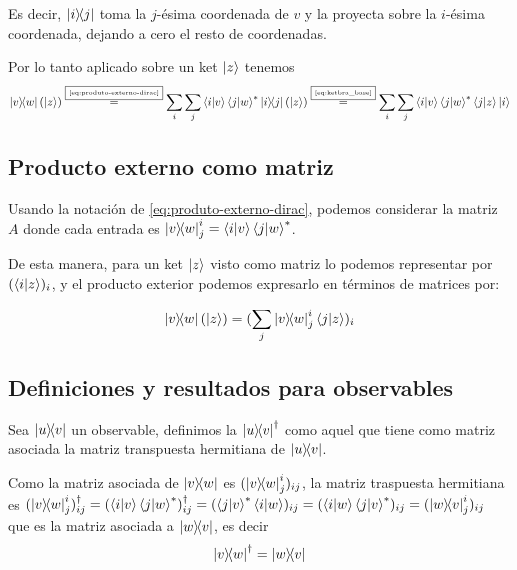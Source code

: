 Es decir, $\ketbra{i}{j}$ toma la $j$-ésima coordenada de $v$ y la proyecta sobre la $i$-ésima coordenada, dejando a cero el resto de coordenadas.

Por lo tanto aplicado sobre un ket $\ket{z}$ tenemos
\begin{equation}
	\label{eq:producto-externo-ket-coordenadas}
	\ketbra{v}{w}\left( \ket{z} \right) \overset{\fbox{\tiny \ref{eq:produto-externo-dirac}}}{=} \sum_{i}\sum_{j}\braket{i}{v}\braket{j}{w}^*\ketbra{i}{j}\left( \ket{z} \right)\overset{\fbox{\tiny \ref{eq:ketbra_base}}}{=}\sum_{i}\sum_{j}\braket{i}{v}\braket{j}{w}^*\braket{j}{z}\ket{i}
\end{equation}

\subsection{Producto externo como matriz}\label{subsec:producto-externo-como-matriz}
Usando la notación de \eqref{eq:produto-externo-dirac}, podemos considerar la matriz $A$ donde cada entrada es $\ketbra{v}{w}^{i}_{j}=\braket{i}{v}\braket{j}{w}^*$.

De esta manera, para un ket $\ket{z}$ visto como matriz lo podemos representar por $(\braket{i}{z})_i$, y el producto exterior podemos expresarlo en términos de matrices por:

\begin{equation}
	\label{eq:producto-externo-matriz}
	\ketbra{v}{w}(\ket{z}) = (\sum_{j}\ketbra{v}{w}^{i}_{j}\braket{j}{z})_i
\end{equation}

\subsection{Definiciones y resultados para observables}\label{subsec:definiciones-y-resultados-para-observables}

\begin{definition}
	Sea $\ketbra{u}{v}$ un observable, definimos la  $\ketbra{u}{v}^\dag$ como aquel que tiene como matriz asociada la matriz transpuesta hermitiana de $\ketbra{u}{v}$.
\end{definition}

Como la matriz asociada de $\ketbra{v}{w}$ es $(\ketbra{v}{w}^{i}_{j})_{ij}$, la matriz traspuesta hermitiana es $(\ketbra{v}{w}^{i}_{j})_{ij}^\dag = (\braket{i}{v}\braket{j}{w}^*)_{ij}^\dag=(\braket{j}{v}^*\braket{i}{w})_{ij}=(\braket{i}{w}\braket{j}{v}^*)_{ij}=(\ketbra{w}{v}^{i}_{j})_{ij}$ que es la matriz asociada a $\ketbra{w}{v}$, es decir
\begin{equation}
	\label{eq:traspuesta-hermitiana-producto-externo}
	\ketbra{v}{w}^\dag = \ketbra{w}{v}
\end{equation}

